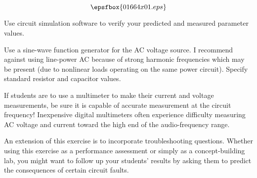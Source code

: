 

$$\epsfbox{01664x01.eps}$$

\vfil \eject






Use circuit simulation software to verify your predicted and measured parameter values.







Use a sine-wave function generator for the AC voltage source.  I recommend against using line-power AC because of strong harmonic frequencies which may be present (due to nonlinear loads operating on the same power circuit).  Specify standard resistor and capacitor values.

If students are to use a multimeter to make their current and voltage measurements, be sure it is capable of accurate measurement at the circuit frequency!  Inexpensive digital multimeters often experience difficulty measuring AC voltage and current toward the high end of the audio-frequency range.

An extension of this exercise is to incorporate troubleshooting questions.  Whether using this exercise as a performance assessment or simply as a concept-building lab, you might want to follow up your students' results by asking them to predict the consequences of certain circuit faults.





